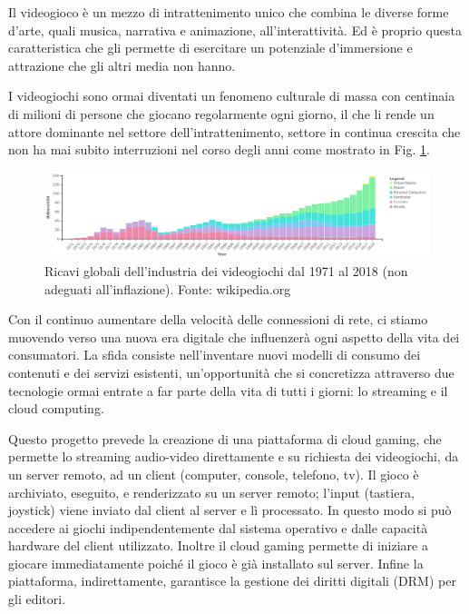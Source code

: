 %
%

Il videogioco è un mezzo di intrattenimento unico che combina le diverse forme d'arte, quali musica, narrativa e animazione, all'interattività. Ed è proprio questa caratteristica che gli permette di esercitare un potenziale d'immersione e attrazione che gli altri media non hanno.

I videogiochi sono ormai diventati un fenomeno culturale di massa con centinaia di milioni di persone che giocano regolarmente ogni giorno, il che li rende un attore dominante nel settore dell'intrattenimento, settore in continua crescita che non ha mai subito interruzioni nel corso degli anni come mostrato in Fig. \ref{fig:valore_commerciale_giochi_globale}.

\begin{figure}[H]
	\includegraphics[width=\linewidth]{immagini/valore_commerciale_giochi_globale.png}
	\caption{Ricavi globali dell'industria dei videogiochi dal 1971 al 2018 (non adeguati all'inflazione). Fonte: wikipedia.org}
	\label{fig:valore_commerciale_giochi_globale}
\end{figure}

Con il continuo aumentare della velocità delle connessioni di rete, ci stiamo muovendo verso una nuova era digitale che influenzerà ogni aspetto della vita dei consumatori. La sfida consiste nell'inventare nuovi modelli di consumo dei contenuti e dei servizi esistenti, un'opportunità che si concretizza attraverso due tecnologie ormai entrate a far parte della vita di tutti i giorni: lo streaming e il cloud computing.

Questo progetto prevede la creazione di una piattaforma di cloud gaming, che permette lo streaming audio-video direttamente e su richiesta dei videogiochi, da un server remoto, ad un client (computer, console, telefono, tv). Il gioco è archiviato, eseguito, e renderizzato su un server remoto; l'input (tastiera, joystick) viene inviato dal client al server e lì processato.
In questo modo si può accedere ai giochi indipendentemente dal sistema operativo e dalle capacità hardware del client utilizzato. Inoltre il cloud gaming permette di iniziare a giocare immediatamente poiché il gioco è già installato sul server. Infine la piattaforma, indirettamente, garantisce la gestione dei diritti digitali (DRM) per gli editori.

